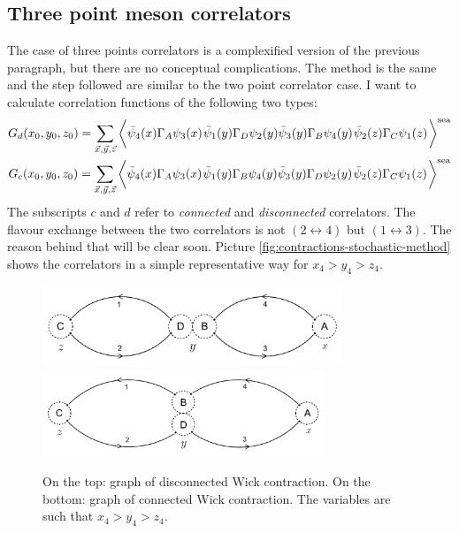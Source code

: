 \documentclass[english, LaM, oneside, noexaminfo]{sapthesis}
\begin{document}
\subsection*{Three point meson correlators}
\noindent
The case of three points correlators is a complexified version of the previous paragraph, but there are no conceptual complications.
The method is the same and the step followed are similar to the two point correlator case.
I want to calculate correlation functions of the following two types:
\begin{equation}\label{eq:GdGc-strategy}
    \begin{gathered}
        G_d(x_0,y_0,z_0) = \sum_{\vec x, \vec y, \vec z} \bigg\langle
        \bar\psi_4(x) \Gamma_A \psi_3 (x)\hspace*{.3mm}
        \bar\psi_1(y) \Gamma_D \psi_2 (y) \bar\psi_3(y) \Gamma_B \psi_4 (y)\hspace*{.3mm}
        \bar\psi_2(z) \Gamma_C \psi_1 (z)\hspace*{.3mm}
        \bigg\rangle^{\text{sea}}\\
        G_c(x_0,y_0,z_0) = \sum_{\vec x, \vec y, \vec z} \bigg\langle
        \bar\psi_4(x) \Gamma_A \psi_3 (x)\hspace*{.3mm}
        \bar\psi_1(y) \Gamma_B \psi_4 (y) \bar\psi_3(y) \Gamma_D \psi_2 (y)\hspace*{.3mm}
        \bar\psi_2(z) \Gamma_C \psi_1 (z)\hspace*{.3mm}
        \bigg\rangle^{\text{sea}}\\
    \end{gathered}
\end{equation}
The subscripts $c$ and $d$ refer to {\it connected} and {\it disconnected} correlators.
The flavour exchange between the two correlators is not $(2\leftrightarrow 4)$ but $(1\leftrightarrow 3)$.
The reason behind that will be clear soon.
Picture \ref{fig:contractions-stochastic-method} shows the correlators in a simple representative way for $x_4>y_4>z_4$.
\begin{figure}
    \centering
    \includegraphics[width=0.8\textwidth]{imgs-MSc-thesis/Wick_stochastic_disc.png}
    \includegraphics[width=0.75\textwidth]{imgs-MSc-thesis/Wick_stochastic_conn.png}
    \caption{On the top: graph of disconnected Wick contraction. On the bottom: graph of connected Wick contraction. The variables are such that $x_4 > y_4 > z_4$.}
\end{figure}\label{fig:contractions-stochastic-method}
\end{document}
